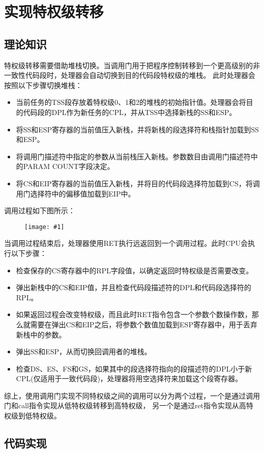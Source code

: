\documentclass[a4paper,left=2.5cm,right=2.5cm,11pt]{article}
\newcommand{\fic}[1]{\begin{figure}[H]
		\center
		\texttt{[image: \#1]}
	\end{figure}}
\begin{document}
\tableofcontents

\clearpage

\section{实现特权级转移}
\subsection{理论知识}
	特权级转移需要借助堆栈切换。当调用门用于把程序控制转移到一个更高级别的非一致性代码段时，处理器会自动切换到目的代码段特权级的堆栈。
	此时处理器会按照以下步骤切换堆栈：
	\begin{itemize}
		\item 当前任务的TSS段存放着特权级0、1和2的堆栈的初始指针值。处理器会将目的代码段的DPL作为新任务的CPL，并从TSS中选择新栈的SS和ESP。
		\item 将SS和ESP寄存器的当前值压入新栈，并将新栈的段选择符和栈指针加载到SS和ESP。
		\item 将调用门描述符中指定的参数从当前栈压入新栈。参数数目由调用门描述符中的PARAM COUNT字段决定。
		\item 将CS和EIP寄存器的当前值压入新栈，并将目的代码段选择符加载到CS，将调用门选择符中的偏移值加载到EIP中。
	\end{itemize}

	调用过程如下图所示：
	\fic{1.png}

	当调用过程结束后，处理器使用RET执行远返回到一个调用过程。此时CPU会执行以下步骤：
	\begin{itemize}
		\item 检查保存的CS寄存器中的RPL字段值，以确定返回时特权级是否需要改变。
		\item 弹出新栈中的CS和EIP值，并且检查代码段描述符的DPL和代码段选择符的RPL。
		\item 如果返回过程会改变特权级，而且此时RET指令包含一个参数个数操作数，那么就需要在弹出CS和EIP之后，将参数个数值加载到ESP寄存器中，用于丢弃新栈中的参数。
		\item 弹出SS和ESP，从而切换回调用者的堆栈。
		\item 检查DS、ES、FS和GS，如果其中的段选择符指向的段描述符的DPL小于新CPL(仅适用于一致代码段)，处理器将用空选择符来加载这个段寄存器。
	\end{itemize}

	综上，使用调用门实现不同特权级之间的调用可以分为两个过程，一个是通过调用门和call指令实现从低特权级转移到高特权级，
	另一个是通过ret指令实现从高特权级到低特权级。

\subsection{代码实现}
\end{document}
